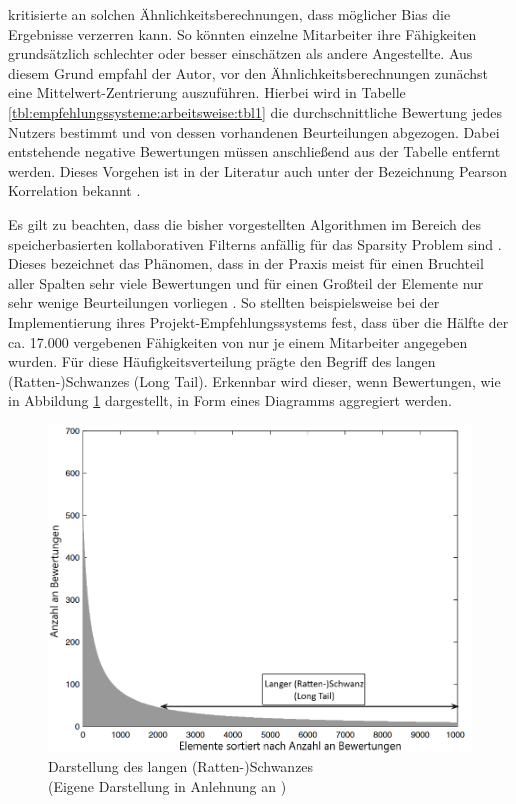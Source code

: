 \textcite[S. 35ff.]{recommenderSystems:2016} kritisierte an solchen Ähnlichkeitsberechnungen, dass möglicher Bias die Ergebnisse verzerren kann. So könnten einzelne Mitarbeiter ihre Fähigkeiten grundsätzlich schlechter oder besser einschätzen als andere Angestellte. Aus diesem Grund empfahl der Autor, vor den Ähnlichkeitsberechnungen zunächst eine Mittelwert-Zentrierung auszuführen. Hierbei wird in Tabelle \ref{tbl:empfehlungssysteme:arbeitsweise:tbl1} die durchschnittliche Bewertung jedes Nutzers bestimmt und von dessen vorhandenen Beurteilungen abgezogen. Dabei entstehende negative Bewertungen müssen anschließend aus der Tabelle entfernt werden. Dieses Vorgehen ist in der Literatur auch unter der Bezeichnung Pearson Korrelation bekannt \cite[S. 3]{bharti:2019}.

Es gilt zu beachten, dass die bisher vorgestellten Algorithmen im Bereich des speicherbasierten kollaborativen Filterns anfällig für das Sparsity Problem sind \cite[S. 3f.]{grvcar:2006}. Dieses bezeichnet das Phänomen, dass in der Praxis meist für einen Bruchteil aller Spalten sehr viele Bewertungen und für einen Großteil der Elemente nur sehr wenige Beurteilungen vorliegen \cite[S. 8]{recommenderSystems:2016}. So stellten beispielsweise \textcite[S. 3]{mitre:2014} bei der Implementierung ihres Projekt-Empfehlungssystems fest, dass über die Hälfte der ca. 17.000 vergebenen Fähigkeiten von nur je einem Mitarbeiter angegeben wurden.
Für diese Häufigkeitsverteilung prägte \textcite[S. 12]{anderson:2007} den Begriff des langen (Ratten-)Schwanzes (Long Tail). Erkennbar wird dieser, wenn Bewertungen, wie in Abbildung \ref{fig:empfehlungssysteme:cf:speicherbasiert:abb1} dargestellt, in Form eines Diagramms aggregiert werden.

\begin{figure}[h]
	\centering
	\includegraphics[width=1\textwidth]{gfx/long-tail.png}
	\caption[Darstellung des langen (Ratten-)Schwanzes]{Darstellung des langen (Ratten-)Schwanzes\\
		(Eigene Darstellung in Anlehnung an \cite[S. 33]{recommenderSystems:2016})}
	\label{fig:empfehlungssysteme:cf:speicherbasiert:abb1}
\end{figure}


